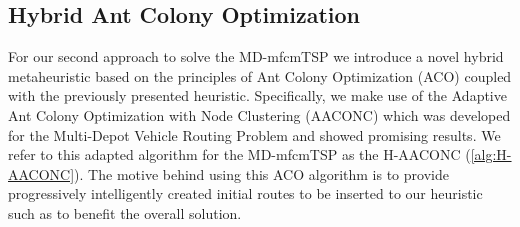 \documentclass{article}
\begin{document}
	\begin{algorithm}[h]
		\small
		\caption{$mutual\_vehicle\_type\_optimization(Sol, n_{max})$}
		\label{alg:vtOpt}
		\;
	\end{algorithm}
	\subsection{Hybrid Ant Colony Optimization}
	 For our second approach to solve the MD-mfcmTSP we introduce a novel hybrid metaheuristic based on the principles of Ant Colony Optimization (ACO) coupled with the previously presented heuristic. Specifically, we make use of the Adaptive Ant Colony Optimization with Node Clustering (AACONC) \cite{Stodola2022} which was developed for the Multi-Depot Vehicle Routing Problem and showed promising results. We refer to this adapted algorithm for the MD-mfcmTSP as the H-AACONC (\autoref{alg:H-AACONC}). The motive behind using this ACO algorithm is to provide progressively intelligently created initial routes to be inserted to our heuristic such as to benefit the overall solution.
	\par 
\end{document}
